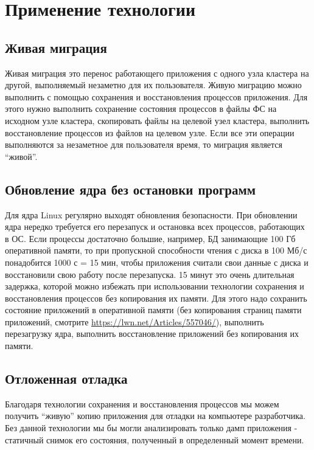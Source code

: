 \section{Применение технологии}

\subsection{Живая миграция}

Живая миграция это перенос работающего приложения с одного узла кластера на другой, выполняемый незаметно для их пользователя. Живую миграцию можно выполнить с помощью сохранения и восстановления процессов приложения. Для этого нужно выполнить сохранение состояния процессов в файлы ФС на исходном узле кластера, скопировать файлы на целевой узел кластера, выполнить восстановление процессов из файлов на целевом узле. Если все эти операции выполняются за незаметное для пользователя время, то миграция является “живой”.
 
\subsection{Обновление ядра без остановки программ}
 
Для ядра Linux регулярно выходят обновления безопасности. При обновлении ядра нередко требуется его перезапуск и остановка всех процессов, работающих в ОС. Если процессы достаточно большие, например, БД занимающие 100 Гб оперативной памяти, то при пропускной способности чтения с диска в 100 Мб/с понадобится 1000 с = 15 мин, чтобы приложения считали свои данные с диска и восстановили свою работу после перезапуска. 15 минут это очень длительная задержка, которой можно избежать при использовании технологии сохранения и восстановления процессов без копирования их памяти. Для этого надо сохранить состояние приложений в оперативной памяти (без копирования страниц памяти приложений, смотрите \url{https://lwn.net/Articles/557046/}), выполнить перезагрузку ядра, выполнить восстановление приложений без копирования их памяти.
 
\subsection{Отложенная отладка}
 
Благодаря технологии сохранения и восстановления процессов мы можем получить “живую” копию приложения для отладки на компьютере разработчика. Без данной технологии мы бы могли анализировать только дамп приложения - статичный снимок его состояния, полученный в определенный момент времени.
 

